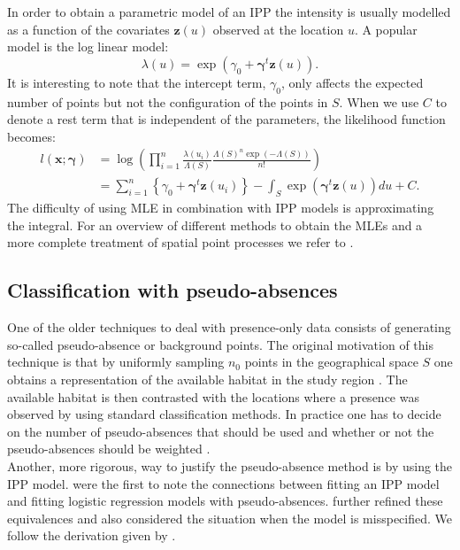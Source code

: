 In order to obtain a parametric model of an IPP the intensity is usually modelled as a function of the covariates $\bm{z}(u)$ observed at the location $u$. A popular model is the log linear model: 
\begin{equation*}
\label{eq:Intensity}
 \lambda(u) = \exp (\gamma_0  + \bm{\gamma}^t\bm{z}(u) ). 
\end{equation*}
It is interesting to note that the intercept term, $\gamma_0$, only affects the expected number of points but not the configuration of the points in $S$. When we use $C$ to denote a rest term that is independent of the parameters, the likelihood function becomes:
\begin{equation*}
\label{eq:IPPlikelihood}
\begin{aligned}
l(\bm{x};\bm{\gamma}) &= \log \left( \prod_{i=1}^n \frac{\lambda(u_i)}{\Lambda(S)} \frac{ \Lambda(S)^n \exp (-\Lambda(S))}{n!}\right)  \\ 
&= \sum_{i=1}^n \left\lbrace \gamma_0 + \bm{\gamma}^t\bm{z}(u_i) \right\rbrace - \int_S \exp (\bm{\gamma}^t\bm{z}(u)) du  + C.
\end{aligned}
\end{equation*}
The difficulty of using MLE in combination with IPP models is approximating the integral. For an overview of different methods to obtain the MLEs and a more complete treatment of spatial point processes we refer to \cite{moller_modern_2007}.

\subsection{Classification with pseudo-absences}
\label{sec:ClassificationWithPseudoAbsences}
One of the older techniques to deal with presence-only data consists of generating so-called pseudo-absence or background points. The original motivation of this technique is that by uniformly sampling $n_0$ points in the geographical space $S$ one obtains a representation of the available habitat in the study region \parencite{pearce_modelling_2006}. The available habitat is then contrasted with the locations where a presence was observed by using standard classification methods. In practice one has to decide on the number of pseudo-absences that should be used and whether or not the pseudo-absences should be weighted \parencite{barbet-massin_selecting_2012}.\\

Another, more rigorous, way to justify the pseudo-absence method is by using the IPP model. \cite{warton_poisson_2010} were the first to note the connections between fitting an IPP model and fitting logistic regression models with pseudo-absences. \cite{fithian_finite-sample_2013} further refined these equivalences and also considered the situation when the model is misspecified. We follow the derivation given by \cite{fithian_finite-sample_2013}.\\

